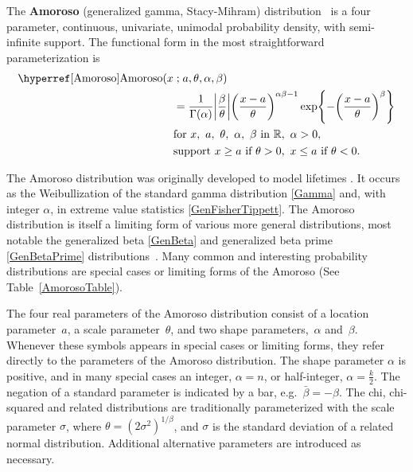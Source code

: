 

\label{sec:Amoroso}
The {\bf Amoroso}  (generalized gamma, Stacy-Mihram) distribution~\cite{Amoroso1925,Johnson1994,Gonzalez2013} is a four parameter,  continuous, univariate, unimodal probability density, with semi-infinite support. The functional form in the most straightforward parameterization is
\begin{align}
\label{Amoroso}  
 \opr{Amoroso}(x&\given  a, \theta, \alpha, \beta) 
\\ \notag&=
\frac{1}{\Gamma(\alpha)} 
\Left|\frac{\beta}{\theta}\Right|
\Left(\frac{x-a}{\theta}\Right)^{\alpha \beta -1}
\exp \Left\{
-  \Left(\frac{x-a}{\theta}\Right)^{\beta}
\Right\}
\checked
\\ \notag
& \text{for } x,\ a,\ \theta,\ \alpha,\ \beta\  \text{in } \mathbb{R}, 
\ \alpha>0, \ 
\\ \notag
& \text{support } x \geq a \ \text{if}\ \theta > 0,  \ x\leq a  \ \text{if}\  \theta < 0 .
\end{align}

The Amoroso distribution was originally developed to model lifetimes \cite{Amoroso1925}. It occurs as the Weibullization of the standard gamma distribution \eqref{Gamma} and, with integer $\alpha$, in extreme value statistics \eqref{GenFisherTippett}. The Amoroso distribution is itself a limiting form of various more general distributions, most notable the generalized beta \eqref{GenBeta} and generalized beta prime \eqref{GenBetaPrime} distributions~\cite{McDonald1984}.
Many common and interesting probability distributions are special cases or limiting forms of the Amoroso  (See Table~\ref{AmorosoTable}). 


The four real parameters of the Amoroso distribution consist of a location parameter~$a$, 
a scale parameter~$\theta$,  and two shape parameters,~$\alpha$ and~$\beta$. Whenever these symbols appears in special cases or limiting forms, they refer directly to the parameters of the Amoroso distribution.
The shape parameter $\alpha$ is positive, and in many special cases an integer, $\alpha=n$, or half-integer, $\alpha=\tfrac{k}{2}$. The negation of a standard parameter is indicated by a bar, e.g.\ $\bar{\beta} = -\beta$. The chi, chi-squared and related distributions are traditionally parameterized with the scale parameter $\sigma$, where $\theta= (2\sigma^2)^{1/{\beta}}$, and $\sigma$ is the standard deviation of a related normal distribution.  Additional alternative parameters are introduced as necessary. 
  

